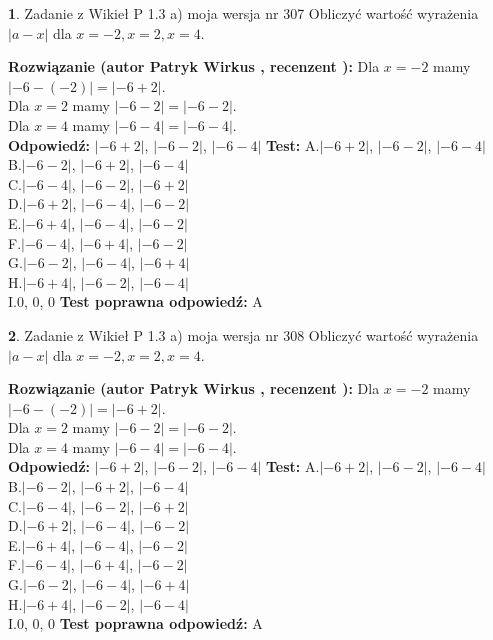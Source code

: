 \documentclass[12pt, a4paper]{article}
\theoremstyle{definition} %
\newtheorem{zad}{}
\newcommand{\zadStart}[1]{\begin{zad}#1\newline}
\newcommand{\zadStop}{\end{zad}}
\newcommand{\rozwStart}[2]{\noindent \textbf{Rozwiązanie (autor #1 , recenzent #2): }\newline}
\newcommand{\rozwStop}{\newline}
\newcommand{\odpStart}{\noindent \textbf{Odpowiedź:}\newline}
\newcommand{\odpStop}{\newline}
\newcommand{\testStart}{\noindent \textbf{Test:}\newline}
\newcommand{\testStop}{\newline}
\newcommand{\kluczStart}{\noindent \textbf{Test poprawna odpowiedź:}\newline}
\newcommand{\kluczStop}{\newline}
\begin{document}
\zadStart{Zadanie z Wikieł P 1.3 a) moja wersja nr 307}
Obliczyć wartość wyrażenia $|a - x|$ dla $x=-2,x=2,x=4$.
\zadStop
\rozwStart{Patryk Wirkus}{}
Dla $x = -2$ mamy $|-6 - (-2)| = |-6 + 2|$.\\
Dla $x = 2$ mamy $|-6 - 2| = |-6 - 2|$.\\
Dla $x = 4$ mamy $|-6 - 4| = |-6 - 4|$.\\
\rozwStop
\odpStart
$|-6 + 2|$, $|-6 - 2|$, $|-6 - 4|$
\odpStop
\testStart
A.$|-6 + 2|$, $|-6 - 2|$, $|-6 - 4|$\\
B.$|-6 - 2|$, $|-6 + 2|$, $|-6 - 4|$\\
C.$|-6 - 4|$, $|-6 - 2|$, $|-6 + 2|$\\
D.$|-6 + 2|$, $|-6 - 4|$, $|-6 - 2|$\\
E.$|-6 + 4|$, $|-6 - 4|$, $|-6 - 2|$\\
F.$|-6 - 4|$, $|-6 + 4|$, $|-6 - 2|$\\
G.$|-6 - 2|$, $|-6 - 4|$, $|-6 + 4|$\\
H.$|-6 + 4|$, $|-6 - 2|$, $|-6 - 4|$\\
I.$0$, $0$, $0$
\testStop
\kluczStart
A
\kluczStop



\zadStart{Zadanie z Wikieł P 1.3 a) moja wersja nr 308}
Obliczyć wartość wyrażenia $|a - x|$ dla $x=-2,x=2,x=4$.
\zadStop
\rozwStart{Patryk Wirkus}{}
Dla $x = -2$ mamy $|-6 - (-2)| = |-6 + 2|$.\\
Dla $x = 2$ mamy $|-6 - 2| = |-6 - 2|$.\\
Dla $x = 4$ mamy $|-6 - 4| = |-6 - 4|$.\\
\rozwStop
\odpStart
$|-6 + 2|$, $|-6 - 2|$, $|-6 - 4|$
\odpStop
\testStart
A.$|-6 + 2|$, $|-6 - 2|$, $|-6 - 4|$\\
B.$|-6 - 2|$, $|-6 + 2|$, $|-6 - 4|$\\
C.$|-6 - 4|$, $|-6 - 2|$, $|-6 + 2|$\\
D.$|-6 + 2|$, $|-6 - 4|$, $|-6 - 2|$\\
E.$|-6 + 4|$, $|-6 - 4|$, $|-6 - 2|$\\
F.$|-6 - 4|$, $|-6 + 4|$, $|-6 - 2|$\\
G.$|-6 - 2|$, $|-6 - 4|$, $|-6 + 4|$\\
H.$|-6 + 4|$, $|-6 - 2|$, $|-6 - 4|$\\
I.$0$, $0$, $0$
\testStop
\kluczStart
A
\kluczStop
\end{document}
